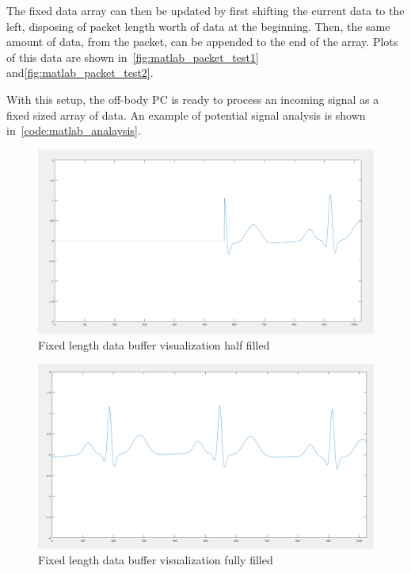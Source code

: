 The fixed data array can then be updated by first shifting the current data to the left, disposing of packet length worth of data at the beginning.
Then, the same amount of data, from the packet, can be appended to the end of the array.
Plots of this data are shown in~\autoref{fig:matlab_packet_test1} and\autoref{fig:matlab_packet_test2}.

With this setup, the off-body PC is ready to process an incoming signal as a fixed sized array of data.
An example of potential signal analysis is shown in~\autoref{code:matlab_analaysis}.

\begin{figure}[!ht]
  \caption{Fixed length data buffer visualization half filled}\label{fig:matlab_packet_test1}
  \centering
  \includegraphics[width=1\columnwidth]{chapters/development/MATLAB/HALF_FILLED}
\end{figure}

\begin{figure}[!ht]
  \caption{Fixed length data buffer visualization fully filled}\label{fig:matlab_packet_test2}
  \centering
  \includegraphics[width=1\columnwidth]{chapters/development/MATLAB/FULL_FILLED}
\end{figure}

